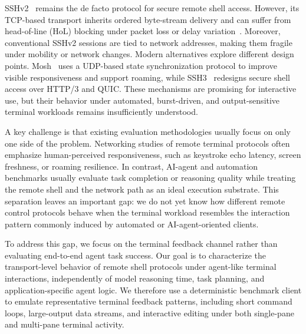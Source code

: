 SSHv2~\cite{Ylonen2006RFC4253} remains the de facto protocol for secure remote shell access.
However, its TCP-based transport inherits ordered byte-stream
delivery and can suffer from head-of-line (HoL) blocking under
packet loss or delay variation~\cite{Scharf2007}. Moreover, conventional SSHv2 sessions are tied to network addresses, making them fragile under mobility or network changes. Modern alternatives explore different design points. Mosh~\cite{Winstein2012} uses a UDP-based state synchronization protocol to improve visible responsiveness and support roaming, while SSH3~\cite{michel2023} redesigns secure shell access over HTTP/3 and QUIC. These mechanisms are promising for interactive use, but their behavior under automated, burst-driven, and output-sensitive terminal workloads remains insufficiently understood.

A key challenge is that existing evaluation methodologies usually focus on only one side of the problem. Networking studies of remote terminal protocols often emphasize human-perceived responsiveness, such as keystroke echo latency, screen freshness, or roaming resilience. In contrast, AI-agent and automation benchmarks usually evaluate task completion or reasoning quality while treating the remote shell and the network path as an ideal execution substrate. This separation leaves an important gap: we do not yet know how different remote control protocols behave when the terminal workload
resembles the interaction pattern commonly induced by automated or
AI-agent-oriented clients.

To address this gap, we focus on the terminal feedback channel rather than evaluating end-to-end agent task success. Our goal is to characterize the transport-level behavior of remote shell protocols under agent-like terminal interactions, independently of model reasoning time, task planning, and application-specific agent logic. We therefore use a deterministic benchmark client to emulate representative terminal feedback patterns, including short command loops, large-output data streams, and interactive editing under both single-pane and multi-pane terminal activity.

